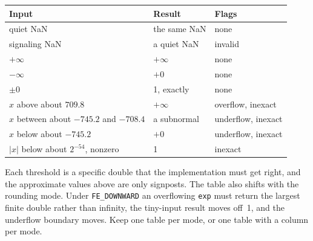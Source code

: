 \documentclass[manuscript, nonacm]{acmart}
\begin{document}
    \begin{table}[tbp]
        \centering
        \begin{tabular}{lll}
            \toprule
            Input                                   & Result       & Flags              \\
            \midrule
            quiet NaN                               & the same NaN & none               \\
            signaling NaN                           & a quiet NaN  & invalid            \\
            $+\infty$                               & $+\infty$    & none               \\
            $-\infty$                               & $+0$         & none               \\
            $\pm 0$                                 & 1, exactly   & none               \\
            $x$ above about $709.8$                 & $+\infty$    & overflow, inexact  \\
            $x$ between about $-745.2$ and $-708.4$ & a subnormal  & underflow, inexact \\
            $x$ below about $-745.2$                & $+0$         & underflow, inexact \\
            $|x|$ below about $2^{-54}$, nonzero    & 1            & inexact            \\
            \bottomrule
        \end{tabular}
    \end{table}

    Each threshold is a specific double that the implementation must get
    right, and the approximate values above are only signposts. The table
    also shifts with the rounding mode. Under \texttt{FE\_DOWNWARD} an
    overflowing \texttt{exp} must return the largest finite double rather
    than infinity, the tiny-input result moves off~1, and the underflow
    boundary moves. Keep one table per mode, or one table with a column per
    mode.
\end{document}
